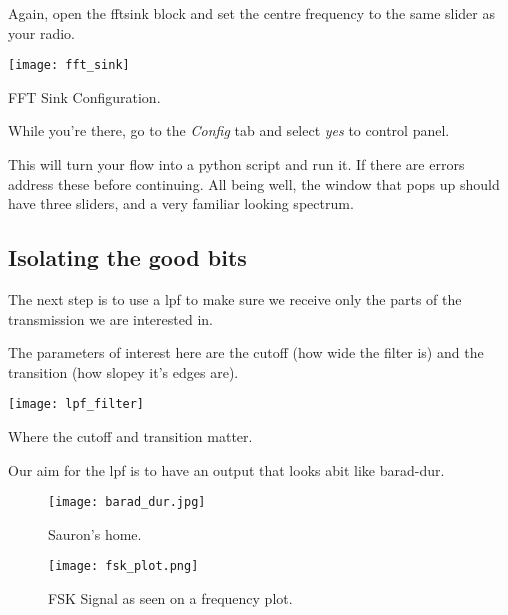 Again, open the \gls{fftsink} block and set the centre frequency to the same slider as your radio. 


\centrefigurestart
\texttt{[image: fft\_sink]}
\caption{FFT Sink Configuration.}
\label{fftconfig}
\centrefigureend

While you're there, go to the \textit{Config} tab and select \textit{yes} to control panel. 


This will turn your flow into a python script and run it. If there are errors address these before continuing. All being well, the window that pops up should have three sliders, and a very familiar looking spectrum. 


\subsection{Isolating the good bits}

The next step is to use a \gls{lpf} to make sure we receive only the parts of the transmission we are interested in. 



The parameters of interest here are the \gls{cutoff} (how wide the filter is) and the \gls{transition} (how slopey it's edges are). 

\centrefigurestart
\texttt{[image: lpf\_filter]}
\caption{Where the \gls{cutoff} and \gls{transition}  matter.}
\centrefigureend

Our aim for the \gls{lpf} is to have an output that looks abit like barad-dur.

\begin{figure}[H]
    \centering
    \begin{minipage}{0.45\textwidth}
        \centering
        \texttt{[image: barad\_dur.jpg]} 
        \caption{Sauron's home.}
    \end{minipage}\hfill
    \begin{minipage}{0.45\textwidth}
        \centering
        \texttt{[image: fsk\_plot.png]}
        \caption{FSK Signal as seen on a frequency plot.}
    \end{minipage}
\end{figure}

